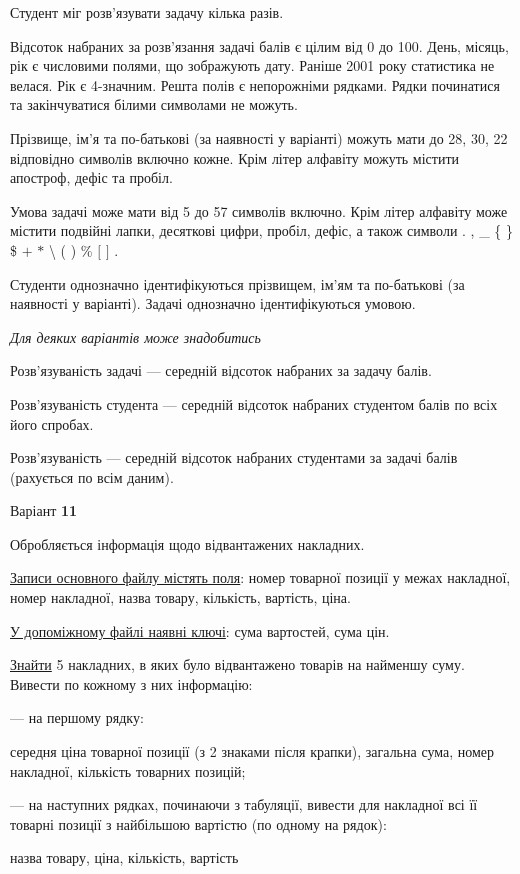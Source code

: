 \documentclass[11pt, ukrainian]{article}
\begin{document}
Студент міг розв’язувати задачу кілька разів.

Відсоток набраних за розв’язання задачі балів є цілим від 0 до 100.
День, місяць, рік є числовими полями, що зображують дату.
Раніше 2001 року статистика не велася. Рік є 4-значним.
Решта полів є непорожніми рядками.
Рядки починатися та закінчуватися білими символами не можуть.

Прізвище, ім’я та по-батькові (за наявності у варіанті) можуть мати до 28, 30, 22 відповідно символів включно кожне. 
Крім літер алфавіту можуть містити апостроф, дефіс та пробіл.

Умова задачі може мати від 5 до 57 символів включно.
Крім літер алфавіту може містити подвійні лапки, десяткові цифри, пробіл, дефіс,
а також символи . , \_ \{ \} \$ $+$ $*$ {\textbackslash} ( ) \% $[$ $]$ .

Студенти однозначно ідентифікуються прізвищем, ім’ям та по-батькові (за наявності у варіанті).
Задачі однозначно ідентифікуються умовою.

\bigskip\textit{Для деяких варіантів може знадобитись}

Розв'язуваність задачі --- середній відсоток набраних за задачу балів.

Розв'язуваність студента --- середній відсоток набраних студентом балів по всіх його спробах.

Розв'язуваність --- середній відсоток набраних студентами за задачі балів (рахується по всім даним).




\par
\newpage
{\center Варіант  \No \textbf { 11 }\par}
\bigskip
Обробляється інформація щодо відвантажених накладних.

\underline{Записи основного файлу містять поля}: номер товарної позиції у межах накладної, номер накладної, назва товару, кількість, вартість, ціна.

\underline{У допоміжному файлі наявні ключі}: сума вартостей, сума цін.

\underline{Знайти} 5 накладних, в яких було відвантажено товарів на найменшу суму. Вивести по кожному з них інформацію:\par
{\noindent}--- на першому рядку:\par
середня ціна товарної позиції (з 2 знаками після крапки), загальна сума, номер накладної, кількість товарних позицій;

{\noindent}--- на наступних рядках, починаючи з табуляції, вивести для накладної всі її товарні позиції з найбільшою вартістю (по одному на рядок):\par
назва товару, ціна, кількість, вартість
\end{document}
